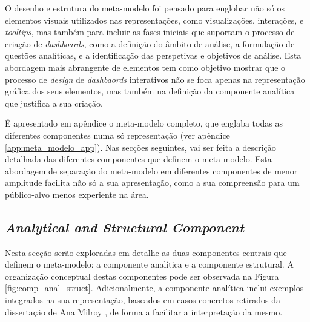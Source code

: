 O desenho e estrutura do meta-modelo foi pensado para englobar não só os elementos visuais utilizados nas representações, como visualizações, interações, e \textit{tooltips}, mas também para incluir as fases iniciais que suportam o processo de criação de \textit{dashboards}, como a definição do âmbito de análise, a formulação de questões analíticas, e a identificação das perspetivas e objetivos de análise. Esta abordagem mais abrangente de elementos tem como objetivo mostrar que o processo de \textit{design} de \textit{dashbaords} interativos não se foca apenas na representação gráfica dos seus elementos, mas também na definição da componente analítica que justifica a sua criação.

É apresentado em apêndice o meta-modelo completo, que englaba todas as diferentes componentes numa só representação (ver apêndice \ref{app:meta_modelo_app}). Nas secções seguintes, vai ser feita a descrição detalhada das diferentes componentes que definem o meta-modelo. Esta abordagem de separação do meta-modelo em diferentes componentes de menor amplitude facilita não só a sua apresentação, como a sua compreensão para um público-alvo menos experiente na área.

\subsection{\textit{Analytical and Structural Component}} %
\label{sub:anal_struct_comp}

Nesta secção serão exploradas em detalhe as duas componentes centrais que definem o meta-modelo: a componente analítica e a componente estrutural. A organização conceptual destas componentes pode ser observada na Figura \ref{fig:comp_anal_struct}. Adicionalmente, a componente analítica inclui exemplos integrados na sua representação, baseados em casos concretos retirados da dissertação de Ana Milroy \cite{milroy2025}, de forma a facilitar a interpretação da mesmo.

